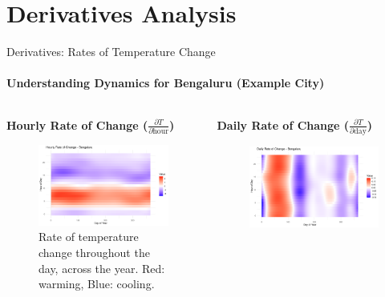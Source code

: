 \documentclass[svgnames, 12pt]{beamer}
\begin{document}
\section{Derivatives Analysis}
\begin{frame}{Derivatives: Rates of Temperature Change}
  \framesubtitle{Understanding Dynamics for Bengaluru (Example City)}
  \begin{columns}[T] %
    \begin{column}{0.5\textwidth}
      \textbf{Hourly Rate of Change ($\frac{\partial T}{\partial \text{hour}}$)}
      \begin{figure}
        \includegraphics[width=\linewidth]{../data/output/figures/derivative_hour1_city_avg.png}
        \caption*{Rate of temperature change throughout the day, across the year. Red: warming, Blue: cooling.}
      \end{figure}
    \end{column}
    \begin{column}{0.5\textwidth}
      \textbf{Daily Rate of Change ($\frac{\partial T}{\partial \text{day}}$)}
      \begin{figure}
        \includegraphics[width=\linewidth]{../data/output/figures/derivative_day1_city_avg.png}

\end{figure}
\end{column}
\end{columns}
\end{frame}
\end{document}
